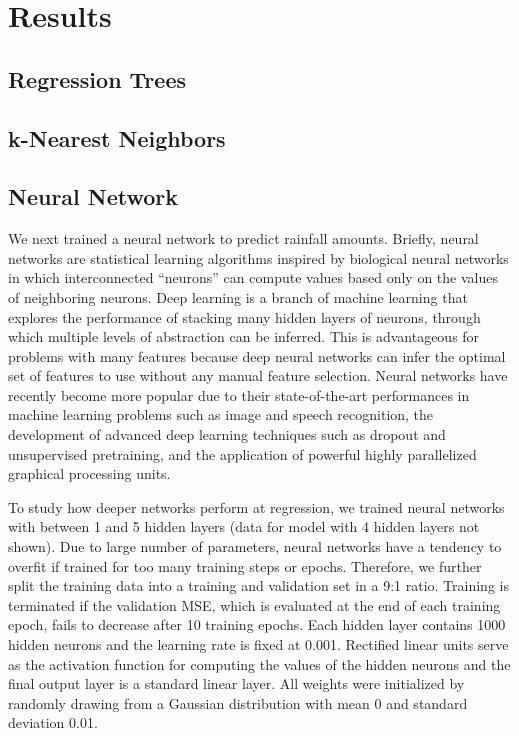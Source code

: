 \documentclass[12pt] {article}
\begin{document}
\section{Results}
\subsection{Regression Trees}
\subsection{k-Nearest Neighbors}
\subsection{Neural Network}
We next trained a neural network to predict rainfall amounts. Briefly, neural networks are statistical learning algorithms inspired by biological neural networks in which interconnected ``neurons'' can compute values based only on the values of neighboring neurons. Deep learning is a branch of machine learning that explores the performance of stacking many hidden layers of neurons, through which multiple levels of abstraction can be inferred. This is advantageous for problems with many features because deep neural networks can infer the optimal set of features to use without any manual feature selection. Neural networks have recently become more popular due to their state-of-the-art performances in machine learning problems such as image and speech recognition, the development of advanced deep learning techniques such as dropout and unsupervised pretraining, and the application of powerful highly parallelized graphical processing units.

To study how deeper networks perform at regression, we trained neural networks with between 1 and 5 hidden layers (data for model with 4 hidden layers not shown). Due to large number of parameters, neural networks have a tendency to overfit if trained for too many training steps or epochs. Therefore, we further split the training data into a training and validation set in a 9:1 ratio. Training is terminated if the validation MSE, which is evaluated at the end of each training epoch, fails to decrease after 10 training epochs. Each hidden layer contains 1000 hidden neurons and the learning rate is fixed at 0.001. Rectified linear units serve as the activation function for computing the values of the hidden neurons and the final output layer is a standard linear layer. All weights were initialized by randomly drawing from a Gaussian distribution with mean 0 and standard deviation 0.01.
\end{document}
